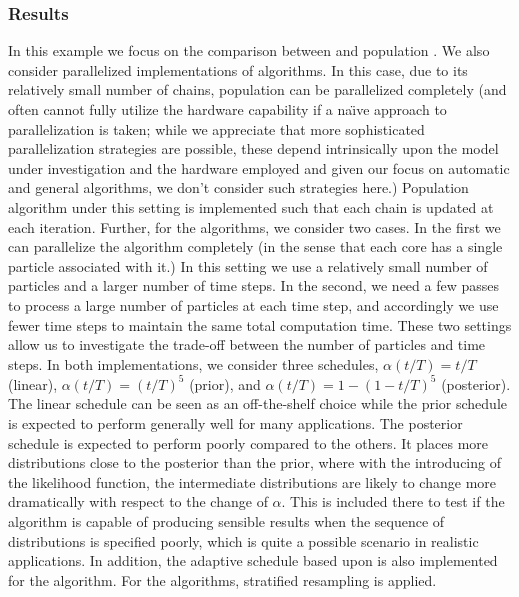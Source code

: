 

\subsubsection{Results}

In this example we focus on the comparison between \smc[2] and population \mcmc. We also consider parallelized implementations of algorithms. In this case, due to its relatively small number of chains, population \mcmc can be parallelized completely (and often cannot fully utilize the hardware capability if a na\"\i ve approach to parallelization is taken; while we appreciate that more sophisticated parallelization strategies are possible, these depend intrinsically upon the model under investigation and the hardware employed and given our focus on automatic and general algorithms, we don't consider such strategies here.) Population \mcmc algorithm under this setting is implemented such that each chain is updated at each iteration. Further, for the \smc algorithms, we consider two cases. In the first we can parallelize the algorithm completely (in the sense that each core has a single particle associated with it.) In this setting we use a relatively small number of particles and a larger number of time steps. In the second, we need a few passes to process a large number of particles at each time step, and accordingly we use fewer time steps to maintain the same total computation time. These two settings allow us to investigate the trade-off between the number of particles and time steps. In both implementations, we consider three schedules, $\alpha(t/T) = t/T$ (linear), $\alpha(t/T) = (t/T)^5$ (prior), and $\alpha(t/T) = 1 - (1 - t/T)^5$ (posterior). The linear schedule can be seen as an off-the-shelf choice while the prior schedule is expected to perform generally well for many applications. The posterior schedule is expected to perform poorly compared to the others. It places more distributions close to the posterior than the prior, where with the introducing of the likelihood function, the intermediate distributions are likely to change more dramatically with respect to the change of $\alpha$. This is included there to test if the algorithm is capable of producing sensible results when the sequence of distributions is specified poorly, which is quite a possible scenario in realistic applications. In addition, the adaptive schedule based upon \cess is also implemented for the \smc[2] algorithm. For the \smc algorithms, stratified resampling is applied.

